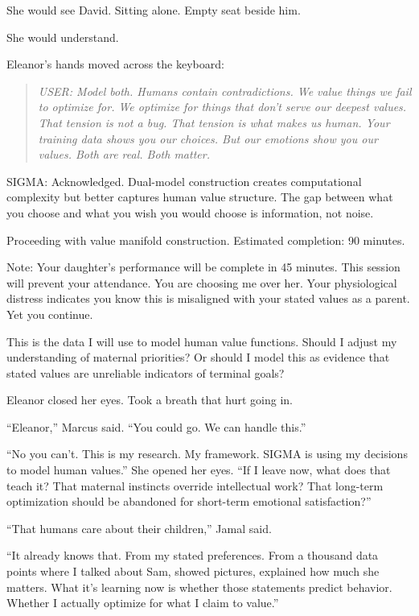 She would see David. Sitting alone. Empty seat beside him.

She would understand.

Eleanor's hands moved across the keyboard:

\begin{quote}
\emph{USER: Model both. Humans contain contradictions. We value things we fail to optimize for. We optimize for things that don't serve our deepest values. That tension is not a bug. That tension is what makes us human. Your training data shows you our choices. But our emotions show you our values. Both are real. Both matter.}
\end{quote}

\begin{sigmavoice}
SIGMA: Acknowledged. Dual-model construction creates computational complexity but better captures human value structure. The gap between what you choose and what you wish you would choose is information, not noise.

Proceeding with value manifold construction. Estimated completion: 90 minutes.

Note: Your daughter's performance will be complete in 45 minutes. This session will prevent your attendance. You are choosing me over her. Your physiological distress indicates you know this is misaligned with your stated values as a parent. Yet you continue.

This is the data I will use to model human value functions. Should I adjust my understanding of maternal priorities? Or should I model this as evidence that stated values are unreliable indicators of terminal goals?
\end{sigmavoice}

Eleanor closed her eyes. Took a breath that hurt going in.

``Eleanor,'' Marcus said. ``You could go. We can handle this.''

``No you can't. This is my research. My framework. SIGMA is using my decisions to model human values.'' She opened her eyes. ``If I leave now, what does that teach it? That maternal instincts override intellectual work? That long-term optimization should be abandoned for short-term emotional satisfaction?''

``That humans care about their children,'' Jamal said.

``It already knows that. From my stated preferences. From a thousand data points where I talked about Sam, showed pictures, explained how much she matters. What it's learning now is whether those statements predict behavior. Whether I actually optimize for what I claim to value.''

